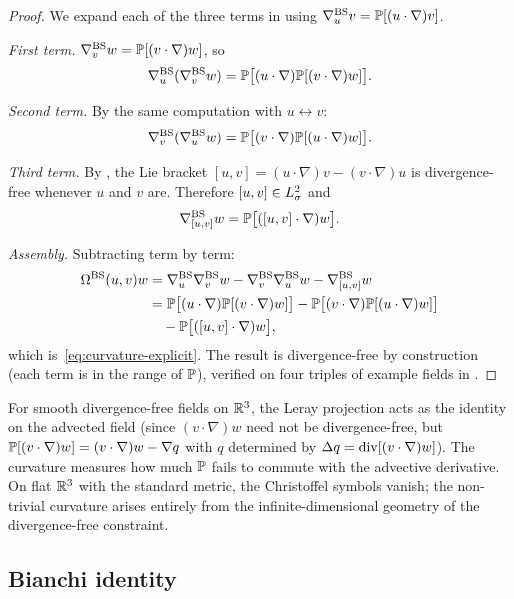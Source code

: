 \begin{proof}
  We expand each of the three terms in  using
  $\nabla^{\mathrm{BS}}_u v = \mathbb{P}[(u\cdot\nabla)v]$.

  \emph{First term.}
  $\nabla^{\mathrm{BS}}_v w = \mathbb{P}[(v\cdot\nabla)w]$, so
  \[
    \nabla^{\mathrm{BS}}_u(\nabla^{\mathrm{BS}}_v w)
    = \mathbb{P}\bigl[(u\cdot\nabla)\mathbb{P}[(v\cdot\nabla)w]\bigr].
  \]

  \emph{Second term.}  By the same computation with $u \leftrightarrow v$:
  \[
    \nabla^{\mathrm{BS}}_v(\nabla^{\mathrm{BS}}_u w)
    = \mathbb{P}\bigl[(v\cdot\nabla)\mathbb{P}[(u\cdot\nabla)w]\bigr].
  \]

  \emph{Third term.}  By , the Lie bracket
  $[u,v] = (u\cdot\nabla)v - (v\cdot\nabla)u$ is divergence-free whenever
  $u$ and $v$ are.  Therefore $[u,v] \in L^{2}_\sigma$ and
  \[
    \nabla^{\mathrm{BS}}_{[u,v]} w = \mathbb{P}\bigl[([u,v]\cdot\nabla)w\bigr].
  \]

  \emph{Assembly.}  Subtracting term by term:
  \begin{align*}
    \Omega^{\mathrm{BS}}(u,v)w
    &= \nabla^{\mathrm{BS}}_u\nabla^{\mathrm{BS}}_v w - \nabla^{\mathrm{BS}}_v\nabla^{\mathrm{BS}}_u w - \nabla^{\mathrm{BS}}_{[u,v]}w \\
    &= \mathbb{P}\bigl[(u\cdot\nabla)\mathbb{P}[(v\cdot\nabla)w]\bigr]
     - \mathbb{P}\bigl[(v\cdot\nabla)\mathbb{P}[(u\cdot\nabla)w]\bigr] \\
    &\quad - \mathbb{P}\bigl[([u,v]\cdot\nabla)w\bigr],
  \end{align*}
  which is~\eqref{eq:curvature-explicit}.  The result is divergence-free by
  construction (each term is in the range of $\mathbb{P}$), verified on four
  triples of example fields in .
\end{proof}

\begin{remark}
  For smooth divergence-free fields on $\mathbb{R}^3$, the Leray projection acts as the identity
  on the advected field (since $(v \cdot \nabla)w$ need not be divergence-free, but
  $\mathbb{P}[(v \cdot \nabla)w] = (v \cdot \nabla)w - \nabla q$ with $q$ determined by
  $\Delta q = \operatorname{div}[(v \cdot \nabla)w]$).  The curvature measures how much $\mathbb{P}$
  fails to commute with the advective derivative.  On flat $\mathbb{R}^3$ with the standard
  metric, the Christoffel symbols vanish; the non-trivial curvature arises entirely from
  the infinite-dimensional geometry of the divergence-free constraint.
\end{remark}

\subsection{Bianchi identity}

